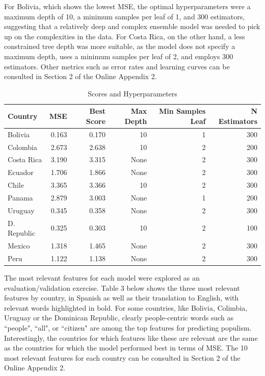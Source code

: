 \documentclass[12pt,letterpaper]{article}
\begin{document}
For Bolivia, which shows the lowest MSE, the optimal hyperparameters were a maximum depth of 10, a minimum samples per leaf of 1, and 300 estimators, suggesting that a relatively deep and complex ensemble model was needed to pick up on the complexities in the data. For Costa Rica, on the other hand, a less constrained tree depth was more suitable, as the model does not specify a maximum depth, uses a minimum samples per leaf of 2, and employs 300 estimators. Other metrics such as error rates and learning curves can be consulted in Section 2 of the Online Appendix 2. 

\begin{table}[H]
	\centering
	\caption{Scores and Hyperparameters}
	\begin{tabular}{|l|r|r|r|r|r|}
		\hline
		\textbf{Country} & \textbf{MSE} & \textbf{Best Score} & \textbf{Max Depth} & \textbf{Min Samples Leaf} & \textbf{N Estimators} \\
		\hline
		Bolivia       &  0.163 &       0.170 &       10 &                 1 &           300 \\
		Colombia      &  2.673 &       2.638 &       10 &                 2 &           200 \\
		Costa Rica    &  3.190 &       3.315 &         None &                 2 &           300 \\
		Ecuador       &  1.706 &       1.866 &          None &                 2 &           300 \\
		Chile         &  3.365 &       3.366 &       10 &                 2 &           300 \\
		Panama        &  2.879 &       3.003 &          None &                 1 &           200 \\
		Uruguay       &  0.345 &       0.358 &          None &                 2 &           300 \\
		D. Republic   &  0.325 &       0.303 &       10 &                 2 &           100 \\
		Mexico        &  1.318 &       1.465 &          None &                 2 &           300 \\
		Peru          &  1.122 &       1.138 &          None &                 2 &           300 \\
		\hline
	\end{tabular}
\end{table}
	
\noindent The most relevant features for each model were explored as an evaluation/validation exercise. Table 3 below shows the three most relevant features by country, in Spanish as well as their translation to English, with relevant words highlighted in bold. For some countries, like Bolivia, Colimbia, Uruguay or the Dominican Republic, clearly people-centric words such as ``people", ``all", or ``citizen" are among the top features for predicting populism. Interestingly, the countries for which features like these are relevant are the same as the countries for which the model performed best in terms of MSE. The 10 most relevant features for each country can be consulted in Section 2 of the Online Appendix 2. 	
	
\end{document}
